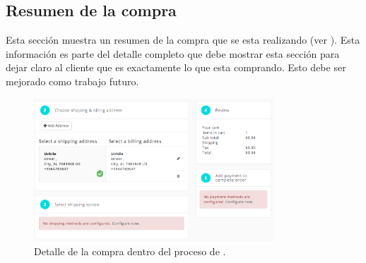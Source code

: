 \subsection{Resumen de la compra}\label{chapter:solucionimplementada:checkout:review}

	Esta sección muestra un resumen de la compra que se esta realizando (ver ). Esta información es parte del detalle completo que debe mostrar esta sección para dejar claro al cliente que es exactamente lo que esta comprando. Esto debe ser mejorado como trabajo futuro.

	\begin{figure}[!h]
		\centering
		\includegraphics[width=0.8\textwidth]{figuras/shipping/steps.png}
		\caption{Detalle de la compra dentro del proceso de \checkoutEF.}
		\label{figure:review:checkout:summary}
	\end{figure}